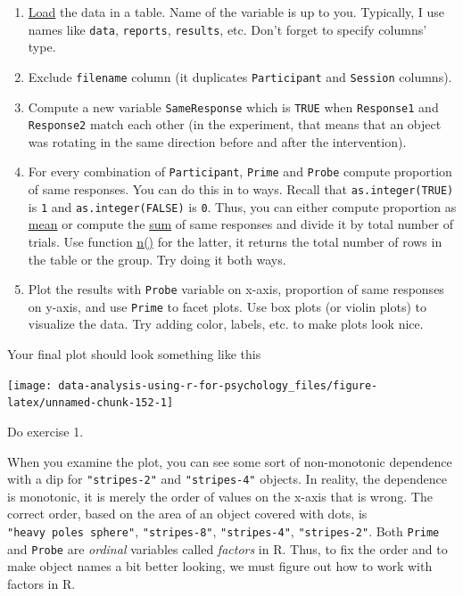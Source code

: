 \documentclass[
]{book}
\providecommand{\tightlist}{%
  \setlength{\itemsep}{0pt}\setlength{\parskip}{0pt}}
\begin{document}
\begin{enumerate}
\def\labelenumi{\arabic{enumi}.}
\tightlist
\item
  \protect\hyperlink{readr}{Load} the data in a table. Name of the variable is up to you. Typically, I use names like \texttt{data}, \texttt{reports}, \texttt{results}, etc. Don't forget to specify columns' type.
\item
  Exclude \texttt{filename} column (it duplicates \texttt{Participant} and \texttt{Session} columns).
\item
  Compute a new variable \texttt{SameResponse} which is \texttt{TRUE} when \texttt{Response1} and \texttt{Response2} match each other (in the experiment, that means that an object was rotating in the same direction before and after the intervention).
\item
  For every combination of \texttt{Participant}, \texttt{Prime} and \texttt{Probe} compute proportion of same responses. You can do this in to ways. Recall that \texttt{as.integer(TRUE)} is \texttt{1} and \texttt{as.integer(FALSE)} is \texttt{0}. Thus, you can either compute proportion as \href{https://stat.ethz.ch/R-manual/R-patched/library/base/html/mean.html}{mean} or compute the \href{https://stat.ethz.ch/R-manual/R-patched/library/base/html/sum.html}{sum} of same responses and divide it by total number of trials. Use function \href{https://dplyr.tidyverse.org/reference/n.html}{n()} for the latter, it returns the total number of rows in the table or the group. Try doing it both ways.
\item
  Plot the results with \texttt{Probe} variable on x-axis, proportion of same responses on y-axis, and use \texttt{Prime} to facet plots. Use box plots (or violin plots) to visualize the data. Try adding color, labels, etc. to make plots look nice.
\end{enumerate}

Your final plot should look something like this

\begin{center}\texttt{[image: data-analysis-using-r-for-psychology\_files/figure-latex/unnamed-chunk-152-1]} \end{center}

Do exercise 1.

When you examine the plot, you can see some sort of non-monotonic dependence with a dip for \texttt{"stripes-2"} and \texttt{"stripes-4"} objects. In reality, the dependence is monotonic, it is merely the order of values on the x-axis that is wrong. The correct order, based on the area of an object covered with dots, is \texttt{"heavy\ poles\ sphere"}, \texttt{"stripes-8"}, \texttt{"stripes-4"}, \texttt{"stripes-2"}. Both \texttt{Prime} and \texttt{Probe} are \emph{ordinal} variables called \emph{factors} in R. Thus, to fix the order and to make object names a bit better looking, we must figure out how to work with factors in R.
\end{document}
